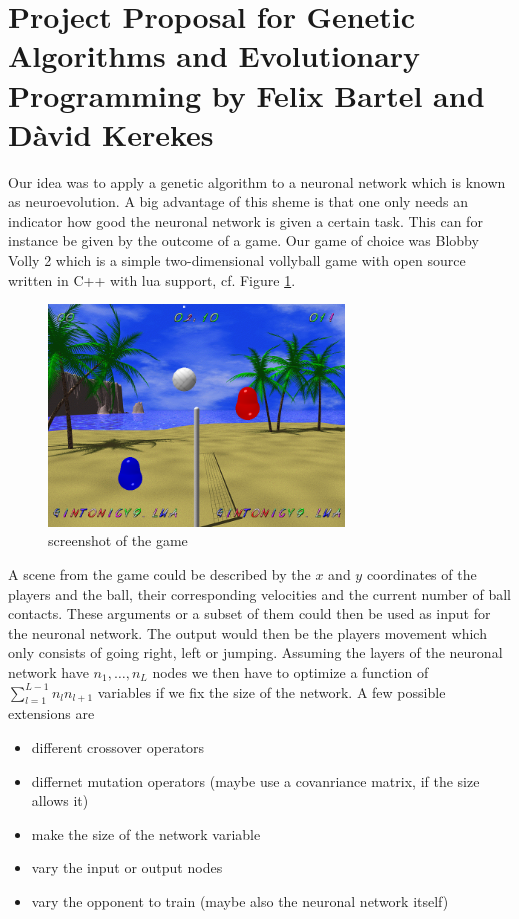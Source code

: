 \documentclass[11pt,a4paper]{scrartcl}
\date{}
\begin{document}
\section*{Project Proposal for Genetic Algorithms and Evolutionary Programming
by Felix Bartel and D\` avid Kerekes}

Our idea was to apply a genetic algorithm to a neuronal network which is known as neuroevolution.
A big advantage of this sheme is that one only needs an indicator how good the neuronal network is given a certain task.
This can for instance be given by the outcome of a game.
Our game of choice was Blobby Volly 2 which is a simple two-dimensional vollyball game with open source written in C++ with lua support, cf. Figure \ref{fig:screenshot}.

\begin{figure}[H]
\center
\includegraphics[width=0.7\textwidth]{img/screenshot.png}
\caption{screenshot of the game}
\label{fig:screenshot}
\end{figure}

A scene from the game could be described by the $x$ and $y$ coordinates of the players and the ball, their corresponding velocities and the current number of ball contacts.
These arguments or a subset of them could then be used as input for the neuronal network.
The output would then be the players movement which only consists of going right, left or jumping.
Assuming the layers of the neuronal network have $n_1,\dots,n_L$ nodes we then have to optimize a function of $\sum_{l=1}^{L-1} n_ln_{l+1}$ variables if we fix the size of the network.
A few possible extensions are
\begin{itemize}
\item different crossover operators
\item differnet mutation operators (maybe use a covanriance matrix, if the size allows it)
\item make the size of the network variable
\item vary the input or output nodes
\item vary the opponent to train (maybe also the neuronal network itself)
\end{itemize}
\end{document}

